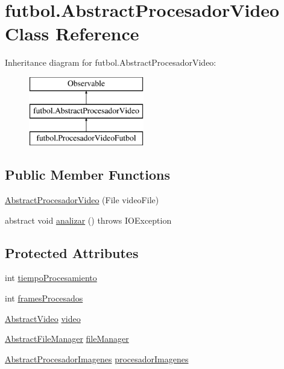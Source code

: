 \hypertarget{classfutbol_1_1_abstract_procesador_video}{}\section{futbol.\+Abstract\+Procesador\+Video Class Reference}
\label{classfutbol_1_1_abstract_procesador_video}
Inheritance diagram for futbol.\+Abstract\+Procesador\+Video\+:\begin{figure}[H]
\begin{center}
\leavevmode
\includegraphics[height=3.000000cm]{classfutbol_1_1_abstract_procesador_video}
\end{center}
\end{figure}
\subsection*{Public Member Functions}
\begin{DoxyCompactItemize}
\item 
\hyperlink{classfutbol_1_1_abstract_procesador_video_a31d3acce4fce02bd1f2b93d4c2b48955}{Abstract\+Procesador\+Video} (File video\+File)
\item 
abstract void \hyperlink{classfutbol_1_1_abstract_procesador_video_a0f419ff3816edd0a8a56c63b46f659c6}{analizar} ()  throws I\+O\+Exception
\end{DoxyCompactItemize}
\subsection*{Protected Attributes}
\begin{DoxyCompactItemize}
\item 
int \hyperlink{classfutbol_1_1_abstract_procesador_video_a0e57f04a2b9cc0a2ec8c8401c450b04e}{tiempo\+Procesamiento}
\item 
int \hyperlink{classfutbol_1_1_abstract_procesador_video_ae51605e84bb0c5baaee9ef9ed92d3df1}{frames\+Procesados}
\item 
\hyperlink{classfutbol_1_1_abstract_video}{Abstract\+Video} \hyperlink{classfutbol_1_1_abstract_procesador_video_a5f7e50874b7d7f2ff79afde2c1e99b27}{video}
\item 
\hyperlink{classfutbol_1_1_abstract_file_manager}{Abstract\+File\+Manager} \hyperlink{classfutbol_1_1_abstract_procesador_video_a87e5c185e420907d8382a14c7e52c2a0}{file\+Manager}
\item 
\hyperlink{classfutbol_1_1_abstract_procesador_imagenes}{Abstract\+Procesador\+Imagenes} \hyperlink{classfutbol_1_1_abstract_procesador_video_a63d5f4b8ca925a751a293ef83c46ee91}{procesador\+Imagenes}
\end{DoxyCompactItemize}


